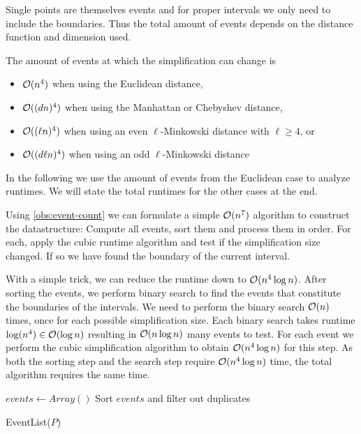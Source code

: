 Single points are themselves events and for proper intervals we only need to include the boundaries. Thus the total amount of events depends on the distance function and dimension used. 

\begin{observation}\label{obs:event-count}
	The amount of events at which the simplification can change is 
	\begin{itemize}
		\item \(\mathcal{O}(n^4)\) when using the Euclidean distance, 
		\item \(\mathcal{O}((dn)^4)\) when using the Manhattan or Chebyshev distance,
		\item \(\mathcal{O}((\ell n)^4)\) when using an even \(\ell\)-Minkowski distance with \(\ell \geq 4\), or 
		\item \(\mathcal{O}((d \ell n)^4)\) when using an odd \(\ell\)-Minkowski distance
	\end{itemize}
\end{observation}

In the following we use the amount of events from the Euclidean case to analyze runtimes. We will state the total runtimes for the other cases at the end. 

Using \cref{obs:event-count} we can formulate a simple \(\mathcal{O}(n^7)\) algorithm to construct the datastructure: Compute all events, sort them and process them in order. For each, apply the cubic runtime algorithm and test if the simplification size changed. If so we have found the boundary of the current interval.

With a simple trick, we can reduce the runtime down to \(\mathcal{O}(n^4 \log n)\). After sorting the events, we perform binary search to find the events that constitute the boundaries of the intervals. We need to perform the binary search \(\mathcal{O}(n)\) times, once for each possible simplification size. Each binary search takes runtime \(\log(n^4) \in \mathcal{O}(\log n)\) resulting in \(\mathcal{O}(n \log n)\) many events to test. For each event we perform the cubic simplification algorithm to obtain \(\mathcal{O}(n^4 \log n)\) for this step. As both the sorting step and the search step require \(\mathcal{O}(n^4\log n)\) time, the total algorithm requires the same time. 

\begin{algorithm}[ht]
  \DontPrintSemicolon
  \BlankLine
	\(events \gets Array()\) 
	Sort \(events\) and filter out duplicates\;
  \caption{EventList(\(P\))}
  \label{algo:event-list}
\end{algorithm}

